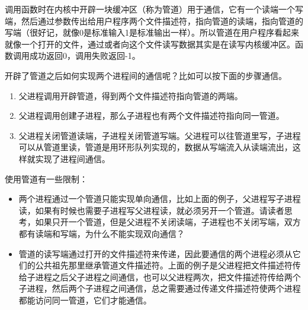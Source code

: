 调用函数时在内核中开辟一块缓冲区（称为管道）用于通信，它有一个读端一个写端，然后通过参数传出给用户程序两个文件描述符，指向管道的读端，指向管道的写端（很好记，就像0是标准输入1是标准输出一样）。所以管道在用户程序看起来就像一个打开的文件，通过或者向这个文件读写数据其实是在读写内核缓冲区。函数调用成功返回0，调用失败返回-1。



开辟了管道之后如何实现两个进程间的通信呢？比如可以按下面的步骤通信。



\begin{enumerate}

\item 父进程调用开辟管道，得到两个文件描述符指向管道的两端。

\item 父进程调用创建子进程，那么子进程也有两个文件描述符指向同一管道。

\item 父进程关闭管道读端，子进程关闭管道写端。父进程可以往管道里写，子进程可以从管道里读，管道是用环形队列实现的，数据从写端流入从读端流出，这样就实现了进程间通信。
\end{enumerate}




使用管道有一些限制：


\begin{itemize}

\item 两个进程通过一个管道只能实现单向通信，比如上面的例子，父进程写子进程读，如果有时候也需要子进程写父进程读，就必须另开一个管道。请读者思考，如果只开一个管道，但是父进程不关闭读端，子进程也不关闭写端，双方都有读端和写端，为什么不能实现双向通信？

\item 管道的读写端通过打开的文件描述符来传递，因此要通信的两个进程必须从它们的公共祖先那里继承管道文件描述符。上面的例子是父进程把文件描述符传给子进程之后父子进程之间通信，也可以父进程两次，把文件描述符传给两个子进程，然后两个子进程之间通信，总之需要通过传递文件描述符使两个进程都能访问同一管道，它们才能通信。
\end{itemize}


